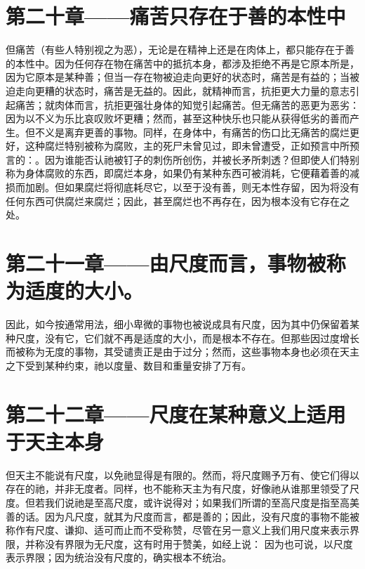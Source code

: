 
\section{第二十章——痛苦只存在于善的本性中}

但痛苦（有些人特别视之为恶），无论是在精神上还是在肉体上，都只能存在于善的本性中。因为任何存在物在痛苦中的抵抗本身，都涉及拒绝不再是它原本所是，因为它原本是某种善；但当一存在物被迫走向更好的状态时，痛苦是有益的；当被迫走向更糟的状态时，痛苦是无益的。因此，就精神而言，抗拒更大力量的意志引起痛苦；就肉体而言，抗拒更强壮身体的知觉引起痛苦。但无痛苦的恶更为恶劣：因为以不义为乐比哀叹败坏更糟；然而，甚至这种快乐也只能从获得低劣的善而产生。但不义是离弃更善的事物。同样，在身体中，有痛苦的伤口比无痛苦的腐烂更好，这种腐烂特别被称为腐败，主的死尸未曾见过，即未曾遭受，正如预言中所预言的：。因为谁能否认祂被钉子的刺伤所创伤，并被长矛所刺透？但即使人们特别称为身体腐败的东西，即腐烂本身，如果仍有某种东西可被消耗，它便藉着善的减损而加剧。但如果腐烂将彻底耗尽它，以至于没有善，则无本性存留，因为将没有任何东西可供腐烂来腐烂；因此，甚至腐烂也不再存在，因为根本没有它存在之处。\par


\section{第二十一章——由尺度而言，事物被称为适度的大小。}

因此，如今按通常用法，细小卑微的事物也被说成具有尺度，因为其中仍保留着某种尺度，没有它，它们就不再是适度的大小，而是根本不存在。但那些因过度增长而被称为无度的事物，其受谴责正是由于过分；然而，这些事物本身也必须在天主之下受到某种约束，祂以度量、数目和重量安排了万有。\par


\section{第二十二章——尺度在某种意义上适用于天主本身}

但天主不能说有尺度，以免祂显得是有限的。然而，将尺度赐予万有、使它们得以存在的祂，并非无度者。同样，也不能称天主为有尺度，好像祂从谁那里领受了尺度。但若我们说祂是至高尺度，或许说得对；如果我们所谓的至高尺度是指至高美善的话。因为凡尺度，就其为尺度而言，都是善的；因此，没有尺度的事物不能被称作有尺度、谦抑、适可而止而不受称赞，尽管在另一意义上我们用尺度来表示界限，并称没有界限为无尺度，这有时用于赞美，如经上说： 因为也可说，以尺度表示界限；因为统治没有尺度的，确实根本不统治。\par

